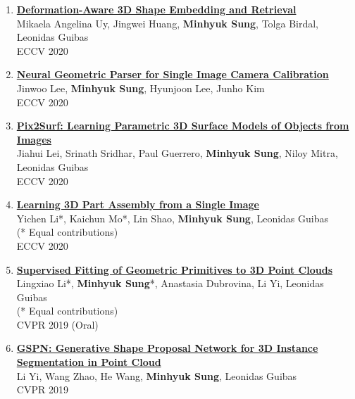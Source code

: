 \documentclass[letterpaper,10pt]{article} %
\newcommand{\blankline}{\quad\pagebreak[2]}
\begin{document}
{{\begin{enumerate}
\item \label{eccv20_4}
\href{https://deformscan2cad.github.io/}{\textbf{Deformation-Aware 3D Shape Embedding and Retrieval}}\\
Mikaela Angelina Uy, Jingwei Huang, \textbf{Minhyuk Sung}, Tolga Birdal, Leonidas Guibas\\
ECCV 2020\\
\blankline

\item \label{eccv20_3}
\href{https://arxiv.org/abs/2007.11855}{\textbf{Neural Geometric Parser for Single Image Camera Calibration}}\\
Jinwoo Lee, \textbf{Minhyuk Sung}, Hyunjoon Lee, Junho Kim\\
ECCV 2020\\
\blankline

\item \label{eccv20_2}
\href{https://geometry.stanford.edu/projects/pix2surf/}{\textbf{Pix2Surf: Learning Parametric 3D Surface Models of Objects from Images}}\\
Jiahui Lei, Srinath Sridhar, Paul Guerrero, \textbf{Minhyuk Sung}, Niloy Mitra, Leonidas Guibas\\
ECCV 2020\\
\blankline

\item \label{eccv20_1}
\href{https://cs.stanford.edu/~kaichun/impartass/}{\textbf{Learning 3D Part Assembly from a Single Image}}\\
Yichen Li*, Kaichun Mo*, Lin Shao, \textbf{Minhyuk Sung}, Leonidas Guibas\\
(* Equal contributions)\\
ECCV 2020\\
\blankline

\item \label{cvpr19_2}
\href{https://arxiv.org/abs/1811.08988}{\textbf{Supervised Fitting of Geometric Primitives to 3D Point Clouds}}\\
Lingxiao Li*, \textbf{Minhyuk Sung}*, Anastasia Dubrovina, Li Yi, Leonidas Guibas\\
(* Equal contributions)\\
CVPR 2019 (Oral)\\
\blankline

\item \label{cvpr19_1}
\href{https://arxiv.org/abs/1812.03320}{\textbf{GSPN: Generative Shape Proposal Network for 3D Instance Segmentation in Point Cloud}}\\
Li Yi, Wang Zhao, He Wang, \textbf{Minhyuk Sung}, Leonidas Guibas\\
CVPR 2019\\
\blankline


\end{enumerate}}}
\end{document}
